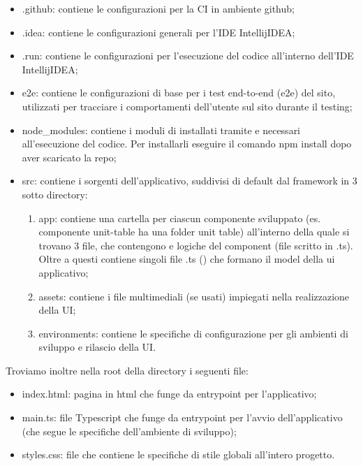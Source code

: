 	\begin{itemize}
		\item{.github}: contiene le configurazioni per la CI in ambiente github;
		\item{.idea}: contiene le configurazioni generali per l'IDE IntellijIDEA;
		\item{.run}: contiene le configurazioni per l'esecuzione del codice all'interno	dell'IDE IntellijIDEA;
		\item{e2e}: contiene le configurazioni di base per i test end-to-end (e2e) del sito, utilizzati per tracciare i comportamenti dell'utente sul sito durante il testing;
		\item{node\_modules}: contiene i moduli di  installati tramite  e necessari all'esecuzione del codice. Per installarli eseguire il comando npm install dopo aver scaricato la repo;
		\item{src}: contiene i sorgenti dell'applicativo, suddivisi di default dal framework in 3 sotto	directory:
		\begin{enumerate}
			\item{app}: contiene una cartella per ciascun componente sviluppato (es. componente unit-table ha una folder unit table) all'interno della quale si trovano 3 file, che contengono   e logiche del component (file scritto in .ts). Oltre a questi	contiene singoli file .ts () che formano il model della ui applicativo;
			\item{assets}: contiene i file multimediali (se usati) impiegati nella realizzazione della UI;
			\item{environments}: contiene le specifiche di configurazione per gli ambienti di sviluppo e rilascio della UI.
		\end{enumerate}
	\end{itemize}

	Troviamo inoltre nella root della directory i seguenti file:
	\begin{itemize}
		\item{index.html}: pagina in html che funge da entrypoint per l'applicativo;
		\item{main.ts}: file Typescript che funge da entrypoint per l'avvio dell'applicativo (che segue le specifiche dell'ambiente di sviluppo);
		\item{styles.css}: file che contiene le specifiche di stile globali all'intero progetto.
	\end{itemize}


